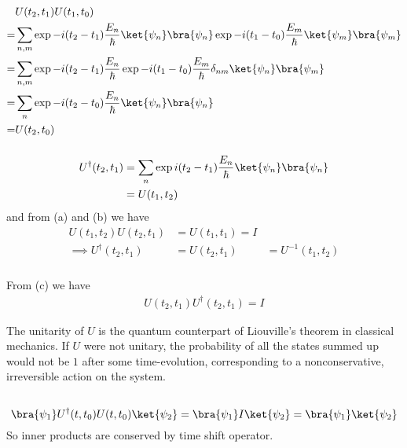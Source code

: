 \documentclass[12pt]{article}
\begin{document}
\subsubsection{} { \begin{align*}
    &U(t_2,t_1)U(t_1,t_0) \\
    =& \sum_{n,m} \exp{ - i(t_2 - t_1)\frac{E_n}{\hbar}} \ket{\psi_n} \bra{\psi_n} \exp{ - i(t_1 - t_0)\frac{E_m}{\hbar}} \ket{\psi_m} \bra{\psi_m} \\
    =& \sum_{n,m} \exp{ - i(t_2 - t_1)\frac{E_n}{\hbar}}  \exp{ - i(t_1 - t_0)\frac{E_m}{\hbar}} \delta_{nm} \ket{\psi_n}\bra{\psi_m} \\
    =& \sum_{n} \exp{ - i(t_2 - t_0)\frac{E_n}{\hbar}} \ket{\psi_n}\bra{\psi_n} \\
    =& U(t_2,t_0)
\end{align*}}
\subsubsection{} { \begin{align*}
    U^\dagger (t_2,t_1) &= \sum_n \exp{ i(t_2 - t_1)\frac{E_n}{\hbar}} \ket{\psi_n} \bra{\psi_n} \\
    &= U(t_1,t_2)
\end{align*}}
and from (a) and (b) we have \begin{align*}
    U(t_1,t_2)U(t_2,t_1) &= U(t_1,t_1) = I\\
    \implies U^\dagger (t_2,t_1) &= U(t_2,t_1) &= U^{-1}(t_1,t_2)
\end{align*}
\subsubsection{} From (c) we have \begin{align*}
    U(t_2,t_1)U^\dagger (t_2,t_1) = I
\end{align*}

The unitarity of \(U\) is the quantum counterpart of Liouville's theorem in classical mechanics. If \(U\) were not unitary, the probability of all the states summed up would not be \(1\) after some time-evolution, corresponding to a nonconservative, irreversible action on the system. 
\subsection{} \subsubsection{} { \[
    \bra{\psi_1}U^\dagger (t,t_0)U(t,t_0)\ket{\psi_2} =
    \bra{\psi_1}I\ket{\psi_2} = \bra{\psi_1}\ket{\psi_2} 
\]}
So inner products are conserved by time shift operator.
\end{document}
